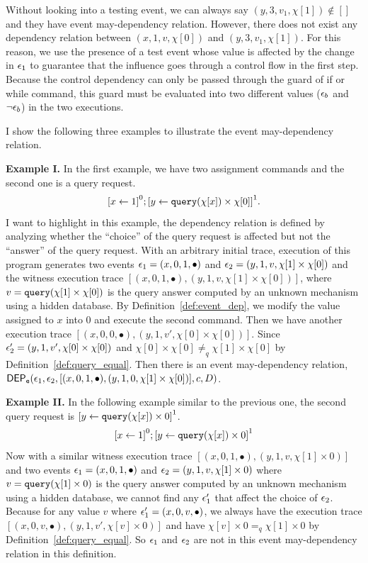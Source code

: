 Without looking into a testing event, we can always say $(y, 3, v_1, \chi[1]) \not\in []$ and they have event may-dependency relation.
However, there does not exist any dependency relation between $(x, 1, v, \chi[0])$ and $(y, 3, v_1, \chi[1])$.
For this reason, we use the presence of a test event whose value is affected by the change in $\mathtt{\epsilon}_1$
to guarantee that the influence goes through a control flow in the first step.
Because the control dependency can only be passed through the guard of if or while command, this guard must be evaluated into two different values ($\mathtt{\epsilon}_b$ and $\neg \mathtt{\epsilon}_b$) in the two executions.

I show the following three examples to illustrate the event may-dependency relation. 

\textbf{Example I.} In the first example, we have two assignment commands and the second one is a query request.
\[
 \clabel{\assign{x}{1}}^0;\clabel{\assign{y}{\query(\chi[x]) \times \chi[0]}}^1.
\]
I want to highlight in this example, the dependency relation is defined by analyzing whether the ``choice'' of the query request is affected but not the ``answer'' of the query request.
With an arbitrary initial trace, execution of this program generates two events $\mathtt{\epsilon}_1 = (x, 0, 1, \bullet)$ and $\mathtt{\epsilon}_2 = (y, 1, v, \chi[1] \times \chi[0])$
and the witness execution trace $[(x, 0, 1, \bullet), (y, 1, v, \chi[1] \times \chi[0])]$,
where $v = {\tt query}(\chi[1] \times \chi[0])$ is the query answer computed by an unknown mechanism using a hidden database.
By Definition~\ref{def:event_dep}, we modify the value assigned to $x$ into $0$ and execute the second command.
Then we have another execution trace 
$[(x, 0, 0, \bullet), (y, 1, v', \chi[0] \times \chi[0])]$.
Since $\mathtt{\epsilon}_2' = (y, 1, v', \chi[0] \times \chi[0])$ and $\chi[0] \times \chi[0] \neq_q \chi[1] \times \chi[0]$
by Definition~\ref{def:query_equal}.
Then there is an event may-dependency relation, $\mathsf{DEP_{\mathtt{e}}}(\mathtt{\epsilon}_1, \mathtt{\epsilon}_2, [(x, 0, 1, \bullet), (y, 1, 0, \chi[1] \times \chi[0])], c, D)$.

\textbf{Example II.} In the following example similar to the previous one, the second query request is $\clabel{\assign{y}{\query(\chi[x]) \times 0}}^1$.
\[
 \clabel{\assign{x}{1}}^0;\clabel{\assign{y}{\query(\chi[x]) \times 0}}^1
\]
Now with a similar witness execution trace $[(x, 0, 1, \bullet), (y, 1, v, \chi[1] \times 0)]$ and two events $\mathtt{\epsilon}_1 = (x, 0, 1, \bullet)$ and $\mathtt{\epsilon}_2 = (y, 1, v, \chi[1] \times 0)$
where $v = {\tt query}(\chi[1] \times 0)$ is the query answer computed by an unknown mechanism using a hidden database,
we cannot find any $\mathtt{\epsilon}_1'$ that affect the choice of $\mathtt{\epsilon}_2$.
Because for any value $v$ where $\mathtt{\epsilon}_1' = (x, 0, v, \bullet)$,
we always have the execution trace $[(x, 0, v, \bullet), (y, 1, v', \chi[v] \times 0)]$ and
have $\chi[v] \times 0 =_q \chi[1] \times 0$ by Definition~\ref{def:query_equal}.
So $\mathtt{\epsilon}_1$ and $\mathtt{\epsilon}_2$ are not in this event may-dependency relation in this definition.

